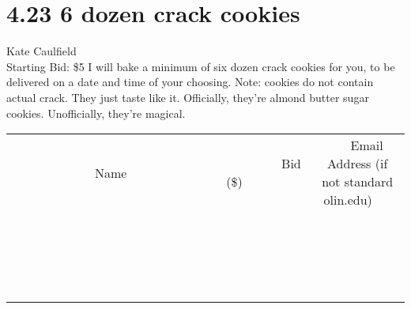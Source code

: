 \documentclass[11pt]{article}
\begin{document}
\section*{4.23 6 dozen crack cookies}
Kate Caulfield
\\
Starting Bid: \$5
\newline
I will bake a minimum of six dozen crack cookies for you, to be delivered on a date and time of your choosing. Note: cookies do not contain actual crack. They just taste like it. Officially, they're almond butter sugar cookies. Unofficially, they're magical.
\\[3ex]
\begin{tabular}{c c c}
~~~~~~~~~~~~~Name~~~~~~~~~~~~~ & ~~~~~~~~~Bid (\$)~~~~~~~~~  & ~~~Email Address (if not standard olin.edu)~~~\\
 & & \\
\hline
 & & \\
\hline
 & & \\
\hline
 & & \\
\hline
 & & \\
\hline
 & & \\
\hline
 & & \\
\hline
 & & \\
\hline
 & & \\
\hline
 & & \\
\hline
 & & \\
\hline
 & & \\
\hline
 & & \\
\hline
 & & \\
\hline
 & & \\
\hline
 & & \\
\hline
 & & \\
\hline
 & & \\
\hline
 & & \\
\hline
\end{tabular}
\newpage
\end{document}
